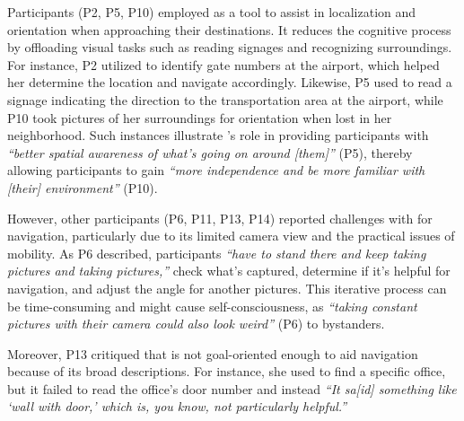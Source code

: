 Participants (P2, P5, P10) employed \bma{} as a tool to assist in localization and orientation when approaching their destinations. 
It reduces the cognitive process by offloading visual tasks such as reading signages and recognizing surroundings.
% 
For instance, P2 utilized \bma{} to identify gate numbers at the airport, which helped her determine the location and navigate accordingly. 
% 
Likewise, P5 used \bma{} to read a signage indicating the direction to the transportation area at the airport, while P10 took pictures of her surroundings for orientation when lost in her neighborhood.  
% 
Such instances illustrate \bma's role in providing participants with \textit{``better spatial awareness of what's going on around [them]''} (P5), thereby allowing participants to gain \textit{``more independence and be more familiar with [their] environment''} (P10).

% 




However, other participants (P6, P11, P13, P14) reported challenges with \bma{} for navigation, particularly due to its limited camera view and the practical issues of mobility. 
As P6 described, participants \textit{``have to stand there and keep taking pictures and taking pictures,''} check what's captured, determine if it's helpful for navigation, and adjust the angle for another pictures. This iterative process can be time-consuming and might cause self-consciousness, as \textit{``taking constant pictures with their camera could also look weird''} (P6) to bystanders.


Moreover, P13 critiqued that \bma{} is not goal-oriented enough to aid navigation because of its broad descriptions. For instance, she used \bma{} to find a specific office, but it failed to read the office's door number and instead \textit{``It sa[id] something like `wall with door,' which is, you know, not particularly helpful.''}







